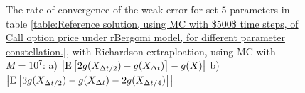 \documentclass[11pt]{article}
\newcommand{\expt}[1]{\mathrm{E}\left[#1\right]}
\begin{document}
\begin{figure}[!htbp]
	\caption{The rate of convergence of the weak error for set $5$ parameters in table \ref{table:Reference solution, using MC with $500$ time steps, of Call option price under rBergomi model, for different parameter constellation.}, with Richardson extraploation, using MC with $M=10^7$: a) $\abs{\expt{2 g(X_{\Delta t/2}) -g(X_{\Delta t})}-g(X)}$  b) $\abs{\expt{3 g(X_{\Delta t/2})-g(X_{\Delta t})-2 g(X_{\Delta t/4})}}$ }
	\label{fig:Weak_rate_H_002_with_rich_K1}
\end{figure}
\FloatBarrier


%
%	
%
\end{document}
